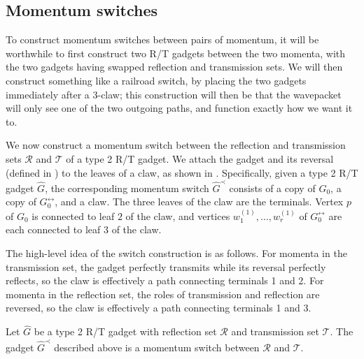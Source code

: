 \documentclass[../thesis-main/thesis-main]{subfiles}
\begin{document}

\subsection{Momentum switches}


To construct momentum switches between pairs of momentum, it will be worthwhile to first construct two R/T gadgets between the two momenta, with the two gadgets having swapped reflection and transmission sets.  We will then construct something like a railroad switch, by placing the two gadgets immediately after a 3-claw; this construction will then be that the wavepacket will only see one of the two outgoing paths, and function exactly how we want it to.


We now construct a momentum switch between the reflection and transmission sets $\mathcal{R}$ and $\mathcal{T}$ of a type 2 R/T gadget.  We attach the gadget and its reversal (defined in ) to the leaves of a claw, as shown in .  Specifically, given a type 2 R/T gadget $\hat{G}$, the corresponding momentum switch $\hat{G}^{\prec}$ consists of a copy of $G_0$, a copy of $G_{0}^{\leftrightarrow}$, and a claw.  The three leaves of the claw are the terminals.  Vertex $p$ of $G_0$ is connected to leaf $2$ of the claw, and vertices $w_1^{(1)},\ldots,w_r^{(1)}$ of $G_{0}^{\leftrightarrow}$ are each connected to leaf $3$ of the claw.

The high-level idea of the switch construction is as follows.  For momenta in the transmission set, the gadget perfectly transmits while its reversal perfectly reflects, so the claw is effectively a path connecting terminals 1 and 2.  For momenta in the reflection set, the roles of transmission and reflection are reversed, so the claw is effectively a path connecting terminals 1 and 3.


\begin{lemma}\label{lem:mom_switch_construction}
Let $\hat{G}$ be a type 2 R/T gadget with reflection set $\mathcal{R}$ and transmission set $\mathcal{T}$.  The gadget $\hat{G}^{\prec}$ described above is a momentum switch between $\mathcal{R}$ and $\mathcal{T}$.
\end{lemma}
\end{document}
